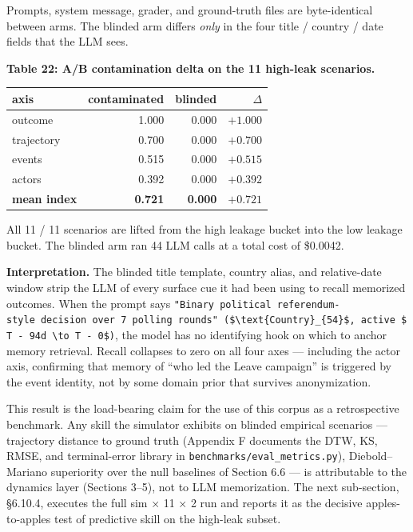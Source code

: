 \documentclass[
]{article}
\begin{document}
Prompts, system message, grader, and ground-truth files are
byte-identical between arms. The blinded arm differs \emph{only} in the
four title / country / date fields that the LLM sees.

\textbf{Table 22: A/B contamination delta on the 11 high-leak
scenarios.}

\begin{longtable}[]{@{}lrrr@{}}
\toprule\noalign{}
axis & contaminated & blinded & \(\Delta\) \\
\midrule\noalign{}
\endhead
\bottomrule\noalign{}
\endlastfoot
outcome & 1.000 & 0.000 & \(+1.000\) \\
trajectory & 0.700 & 0.000 & \(+0.700\) \\
events & 0.515 & 0.000 & \(+0.515\) \\
actors & 0.392 & 0.000 & \(+0.392\) \\
\textbf{mean index} & \textbf{0.721} & \textbf{0.000} &
\textbf{\(+0.721\)} \\
\end{longtable}

All 11 / 11 scenarios are lifted from the high leakage bucket into the
low leakage bucket. The blinded arm ran 44 LLM calls at a total cost of
\$0.0042.

\textbf{Interpretation.} The blinded title template, country alias, and
relative-date window strip the LLM of every surface cue it had been
using to recall memorized outcomes. When the prompt says
\texttt{"Binary\ political\ referendum-style\ decision\ over\ 7\ polling\ rounds"\ (\$\textbackslash{}text\{Country\}\_\{54\}\$,\ active\ \$T\ -\ 94d\ \textbackslash{}to\ T\ -\ 0\$)},
the model has no identifying hook on which to anchor memory retrieval.
Recall collapses to zero on all four axes --- including the actor axis,
confirming that memory of ``who led the Leave campaign'' is triggered by
the event identity, not by some domain prior that survives
anonymization.

This result is the load-bearing claim for the use of this corpus as a
retrospective benchmark. Any skill the simulator exhibits on blinded
empirical scenarios --- trajectory distance to ground truth (Appendix F
documents the DTW, KS, RMSE, and terminal-error library in
\texttt{benchmarks/eval\_metrics.py}), Diebold--Mariano superiority over
the null baselines of Section 6.6 --- is attributable to the dynamics
layer (Sections 3--5), not to LLM memorization. The next sub-section,
§6.10.4, executes the full sim × 11 × 2 run and reports it as the
decisive apples-to-apples test of predictive skill on the high-leak
subset.
\end{document}
